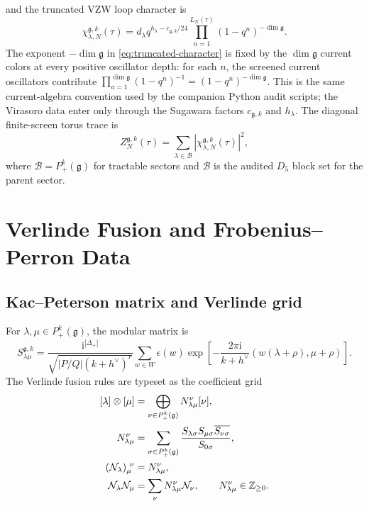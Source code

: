\documentclass[11pt]{article}
\newcommand{\ii}{\mathrm{i}}
\newcommand{\fusion}{\mathcal{N}}
\begin{document}
and the truncated VZW loop character is
\begin{equation}
\boxed{
  \chi_{\lambda,N}^{\mathfrak{g},k}(\tau)
  =d_\lambda q^{h_\lambda-c_{\mathfrak{g},k}/24}
   \prod_{n=1}^{L_N(\tau)}(1-q^n)^{-\dim\mathfrak{g}}.
}
\label{eq:truncated-character}
\end{equation}
The exponent \(-\dim\mathfrak{g}\) in \eqref{eq:truncated-character} is fixed by the \(\dim\mathfrak{g}\) current colors at every positive oscillator depth: for each \(n\), the screened current oscillators contribute \(\prod_{a=1}^{\dim\mathfrak{g}}(1-q^n)^{-1}=(1-q^n)^{-\dim\mathfrak{g}}\).  This is the same current-algebra convention used by the companion Python audit scripts; the Virasoro data enter only through the Sugawara factors \(c_{\mathfrak{g},k}\) and \(h_\lambda\).
The diagonal finite-screen torus trace is
\begin{equation}
  Z_N^{\mathfrak{g},k}(\tau)
  =\sum_{\lambda\in\mathcal{B}}
    |\chi_{\lambda,N}^{\mathfrak{g},k}(\tau)|^2,
  \label{eq:torus-trace}
\end{equation}
where \(\mathcal{B}=P_+^k(\mathfrak{g})\) for tractable sectors and \(\mathcal{B}\) is the audited \(D_5\) block set for the parent sector.

\section{Verlinde Fusion and Frobenius--Perron Data}

\subsection{Kac--Peterson matrix and Verlinde grid}
For \(\lambda,\mu\in P_+^k(\mathfrak{g})\), the modular matrix is
\begin{equation}
  S_{\lambda\mu}^{\mathfrak{g},k}
  =\frac{\ii^{|\Delta_+|}}{\sqrt{|P/Q|(k+h^\vee)^r}}
    \sum_{w\in W}\epsilon(w)
    \exp\left[-\frac{2\pi\ii}{k+h^\vee}(w(\lambda+\rho),\mu+\rho)\right].
  \label{eq:kac-peterson}
\end{equation}
The Verlinde fusion rules are typeset as the coefficient grid
\begin{equation}
\begin{aligned}
  \relax[\lambda]\otimes[\mu]
    &=\bigoplus_{\nu\in P_+^k(\mathfrak{g})}N_{\lambda\mu}^{\nu}[\nu],\\
  N_{\lambda\mu}^{\nu}
    &=\sum_{\sigma\in P_+^k(\mathfrak{g})}
      \frac{S_{\lambda\sigma}S_{\mu\sigma}\overline{S_{\nu\sigma}}}{S_{0\sigma}},\\
  (\fusion_\lambda)_{\mu}^{\ \nu}
    &=N_{\lambda\mu}^{\nu},\\
  \fusion_\lambda\fusion_\mu
    &=\sum_{\nu}N_{\lambda\mu}^{\nu}\fusion_\nu,
    \qquad N_{\lambda\mu}^{\nu}\in\mathbb{Z}_{\ge0}.
\end{aligned}
\label{eq:verlinde-grid}
\end{equation}
\end{document}
